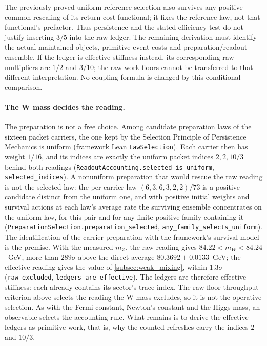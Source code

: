 The previously proved uniform-reference selection also survives any positive common rescaling of its return-cost functional; it fixes the reference law, not that functional's prefactor. Thus persistence and the stated efficiency test do not justify inserting $3/5$ into the raw ledger. The remaining derivation must identify the actual maintained objects, primitive event costs and preparation/readout ensemble. If the ledger is effective stiffness instead, its corresponding raw multipliers are $1/2$ and $3/10$; the raw-work floors cannot be transferred to that different interpretation. No coupling formula is changed by this conditional comparison.

\paragraph{The W mass decides the reading.} The preparation is not a free choice. Among candidate preparation laws of the sixteen packet carriers, the one kept by the Selection Principle of Persistence Mechanics is uniform (framework Lean \texttt{LawSelection}). Each carrier then has weight $1/16$, and its indices are exactly the uniform packet indices $2,2,10/3$ behind both readings (\texttt{ReadoutAccounting.selected\_is\_uniform}, \texttt{selected\_indices}). A nonuniform preparation that would rescue the raw reading is not the selected law: the per-carrier law $(6,3,6,3,2,2)/73$ is a positive candidate distinct from the uniform one, and with positive initial weights and survival actions at each law's average rate the surviving ensemble concentrates on the uniform law, for this pair and for any finite positive family containing it (\texttt{PreparationSelection.preparation\_selected}, \texttt{any\_family\_selects\_uniform}). The identification of the carrier preparation with the framework's survival model is the premise. With the measured $m_Z$, the raw reading gives $84.22<m_W<84.24$~GeV, more than $289\sigma$ above the direct average $80.3692\pm0.0133$~GeV; the effective reading gives the value of \cref{subsec:weak_mixing}, within $1.3\sigma$ (\texttt{raw\_excluded}, \texttt{ledgers\_are\_effective}). The ledgers are therefore effective stiffness: each already contains its sector's trace index. The raw-floor throughput criterion above selects the reading the W mass excludes, so it is not the operative selection. As with the Fermi constant, Newton's constant and the Higgs mass, an observable selects the accounting rule. What remains is to derive the effective ledgers as primitive work, that is, why the counted refreshes carry the indices $2$ and $10/3$.

